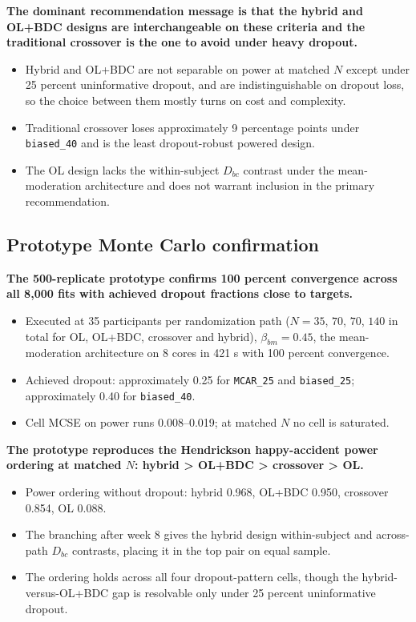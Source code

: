 \documentclass[
  11pt,
]{article}
\begin{document}
\textbf{The dominant recommendation message is that the hybrid and OL+BDC designs are interchangeable on these criteria and the traditional crossover is the one to avoid under heavy dropout.}

\begin{itemize}\setlength{\itemsep}{2pt}\setlength{\parskip}{0pt}
\item Hybrid and OL+BDC are not separable on power at matched $N$ except under 25 percent uninformative dropout, and are indistinguishable on dropout loss, so the choice between them mostly turns on cost and complexity.
\item Traditional crossover loses approximately 9 percentage points under \texttt{biased\_40} and is the least dropout-robust powered design.
\item The OL design lacks the within-subject $D_{bc}$ contrast under the mean-moderation architecture and does not warrant inclusion in the primary recommendation.
\end{itemize}

\subsection{Prototype Monte Carlo confirmation}\label{prototype-monte-carlo-confirmation}

\textbf{The 500-replicate prototype confirms 100 percent convergence across all 8,000 fits with achieved dropout fractions close to targets.}

\begin{itemize}\setlength{\itemsep}{2pt}\setlength{\parskip}{0pt}
\item Executed at 35 participants per randomization path ($N = 35$, $70$, $70$, $140$ in total for OL, OL+BDC, crossover and hybrid), $\beta_{bm}=0.45$, the mean-moderation architecture on 8 cores in 421 s with 100 percent convergence.
\item Achieved dropout: approximately 0.25 for \texttt{MCAR\_25} and \texttt{biased\_25}; approximately 0.40 for \texttt{biased\_40}.
\item Cell MCSE on power runs 0.008--0.019; at matched $N$ no cell is saturated.
\end{itemize}

\textbf{The prototype reproduces the Hendrickson happy-accident power ordering at matched $N$: hybrid > OL+BDC > crossover > OL.}

\begin{itemize}\setlength{\itemsep}{2pt}\setlength{\parskip}{0pt}
\item Power ordering without dropout: hybrid 0.968, OL+BDC 0.950, crossover 0.854, OL 0.088.
\item The branching after week 8 gives the hybrid design within-subject and across-path $D_{bc}$ contrasts, placing it in the top pair on equal sample.
\item The ordering holds across all four dropout-pattern cells, though the hybrid-versus-OL+BDC gap is resolvable only under 25 percent uninformative dropout.
\end{itemize}
\end{document}

